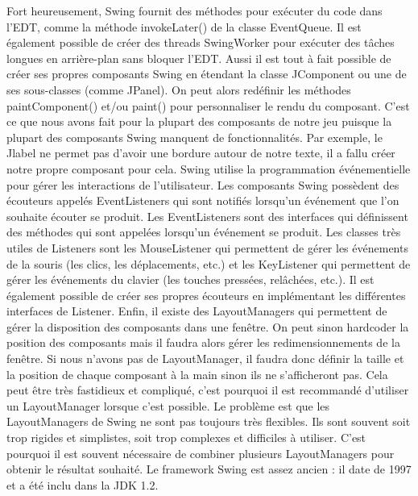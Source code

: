 \documentclass{article}
\begin{document}
    Fort heureusement, Swing fournit des méthodes pour exécuter du code dans l'EDT, comme la méthode invokeLater() de la classe EventQueue.
    Il est également possible de créer des threads SwingWorker pour exécuter des tâches longues en arrière-plan sans bloquer l'EDT.
    Aussi il est tout à fait possible de créer ses propres composants Swing en étendant la classe JComponent ou une de ses sous-classes (comme JPanel).
    On peut alors redéfinir les méthodes paintComponent() et/ou paint() pour personnaliser le rendu du composant.
    C'est ce que nous avons fait pour la plupart des composants de notre jeu puisque la plupart des composants Swing manquent de fonctionnalités.
    Par exemple, le Jlabel ne permet pas d'avoir une bordure autour de notre texte, il a fallu créer notre propre composant pour cela.
    \newline
    Swing utilise la programmation événementielle pour gérer les interactions de l'utilisateur.
    Les composants Swing possèdent des écouteurs appelés EventListeners qui sont notifiés lorsqu'un événement que l'on souhaite écouter se produit.
    Les EventListeners sont des interfaces qui définissent des méthodes qui sont appelées lorsqu'un événement se produit.
    Les classes très utiles de Listeners sont les MouseListener qui permettent de gérer les événements de la souris (les clics, les déplacements, etc.) et les KeyListener qui permettent de gérer les événements du clavier (les touches pressées, relâchées, etc.).
    Il est également possible de créer ses propres écouteurs en implémentant les différentes interfaces de Listener.
    \newline
    Enfin, il existe des LayoutManagers qui permettent de gérer la disposition des composants dans une fenêtre.
    On peut sinon hardcoder la position des composants mais il faudra alors gérer les redimensionnements de la fenêtre.
    Si nous n'avons pas de LayoutManager, il faudra donc définir la taille et la position de chaque composant à la main sinon ils ne s'afficheront pas.
    Cela peut être très fastidieux et compliqué, c'est pourquoi il est recommandé d'utiliser un LayoutManager lorsque c'est possible.
    Le problème est que les LayoutManagers de Swing ne sont pas toujours très flexibles.
    Ils sont souvent soit trop rigides et simplistes, soit trop complexes et difficiles à utiliser.
    C'est pourquoi il est souvent nécessaire de combiner plusieurs LayoutManagers pour obtenir le résultat souhaité.
    \newline
    Le framework Swing est assez ancien : il date de 1997 et a été inclu dans la JDK 1.2.
\end{document}
